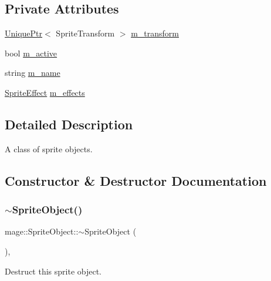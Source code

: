 \subsection*{Private Attributes}
\begin{DoxyCompactItemize}
\item 
\hyperlink{namespacemage_a8c307fbcc33bce9b7f2aa4c26c3b95cf}{Unique\+Ptr}$<$ Sprite\+Transform $>$ \hyperlink{classmage_1_1_sprite_object_a9523ae6f081a8fde3cbb3558f6e327da}{m\+\_\+transform}
\item 
bool \hyperlink{classmage_1_1_sprite_object_a6694bb9cade83917202cf9ca6d359e81}{m\+\_\+active}
\item 
string \hyperlink{classmage_1_1_sprite_object_a6f2a859e40ed391909bb4c87a8b74480}{m\+\_\+name}
\item 
\hyperlink{namespacemage_a9cfe18123066ba4236f548f9de75d881}{Sprite\+Effect} \hyperlink{classmage_1_1_sprite_object_a270f73b8d316f72c4228854d08a6d2ea}{m\+\_\+effects}
\end{DoxyCompactItemize}


\subsection{Detailed Description}
A class of sprite objects. 

\subsection{Constructor \& Destructor Documentation}
\hypertarget{classmage_1_1_sprite_object_aad4d1472cb468d8c19b61ab030332ceb}{}\label{classmage_1_1_sprite_object_aad4d1472cb468d8c19b61ab030332ceb} 
\subsubsection{\texorpdfstring{$\sim$\+Sprite\+Object()}{~SpriteObject()}}
{\footnotesize\ttfamily mage\+::\+Sprite\+Object\+::$\sim$\+Sprite\+Object (\begin{DoxyParamCaption}{ }\end{DoxyParamCaption})\hspace{0.3cm}{\ttfamily [virtual]}, {\ttfamily [default]}}

Destruct this sprite object. \hypertarget{classmage_1_1_sprite_object_af68fccf1e8a51f5b4a99a48dfb515f65}{}\label{classmage_1_1_sprite_object_af68fccf1e8a51f5b4a99a48dfb515f65} 
